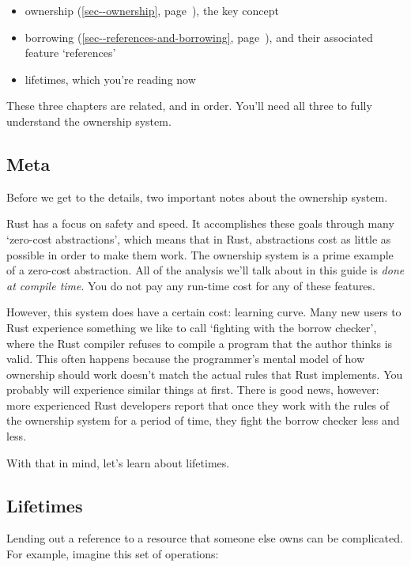 \documentclass[a4paper,]{book}
\renewcommand*{\hyperref}[2][\ar]{%
  \def\ar{#2}%
  #2 (\autoref{#1}, page~\pageref{#1})}
\begin{document}
\begin{itemize}
\itemsep1pt\parskip0pt
\item
  \hyperref[sec--ownership]{ownership}, the key concept
\item
  \hyperref[sec--references-and-borrowing]{borrowing}, and their
  associated feature `references'
\item
  lifetimes, which you're reading now
\end{itemize}

These three chapters are related, and in order. You'll need all three to
fully understand the ownership system.

\subsection{Meta}\label{meta-2}

Before we get to the details, two important notes about the ownership
system.

Rust has a focus on safety and speed. It accomplishes these goals
through many `zero-cost abstractions', which means that in Rust,
abstractions cost as little as possible in order to make them work. The
ownership system is a prime example of a zero-cost abstraction. All of
the analysis we'll talk about in this guide is \emph{done at compile
time}. You do not pay any run-time cost for any of these features.

However, this system does have a certain cost: learning curve. Many new
users to Rust experience something we like to call `fighting with the
borrow checker', where the Rust compiler refuses to compile a program
that the author thinks is valid. This often happens because the
programmer's mental model of how ownership should work doesn't match the
actual rules that Rust implements. You probably will experience similar
things at first. There is good news, however: more experienced Rust
developers report that once they work with the rules of the ownership
system for a period of time, they fight the borrow checker less and
less.

With that in mind, let's learn about lifetimes.

\subsection{Lifetimes}\label{lifetimes}

Lending out a reference to a resource that someone else owns can be
complicated. For example, imagine this set of operations:
\end{document}
